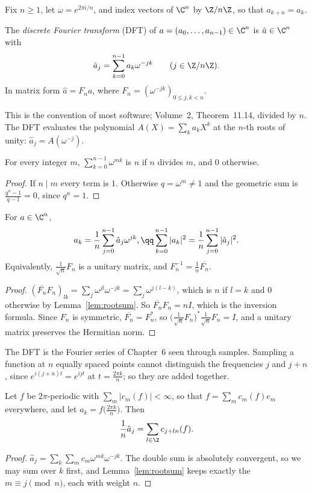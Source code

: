 Fix $n\ge1$, let $\omega=e^{2\pi i/n}$, and index vectors of $\C^n$ by $\Z/n\Z$, so that $a_{k+n}=a_k$.

\begin{definition}
The \emph{discrete Fourier transform} (DFT) of $a=(a_0,\dots,a_{n-1})\in\C^n$ is $\hat a\in\C^n$ with
\[
\hat a_j=\sum_{k=0}^{n-1}a_k\omega^{-jk}\qquad(j\in\Z/n\Z).
\]
In matrix form $\hat a=F_na$, where $F_n=(\omega^{-jk})_{0\le j,k<n}$.
\end{definition}

This is the convention of most software; Volume~2, Theorem~11.14, divided by $n$. The DFT evaluates the polynomial
$A(X)=\sum_ka_kX^k$ at the $n$-th roots of unity: $\hat a_j=A(\omega^{-j})$.

\begin{lemma}\label{lem:rootsum}
For every integer $m$, $\sum_{k=0}^{n-1}\omega^{mk}$ is $n$ if $n$ divides $m$, and $0$ otherwise.
\end{lemma}
\begin{proof}
If $n\mid m$ every term is $1$. Otherwise $q=\omega^m\ne1$ and the geometric sum is $\frac{q^n-1}{q-1}=0$, since $q^n=1$.
\end{proof}

\begin{theorem}\label{thm:dftinversion}
For $a\in\C^n$,
\[
\begin{gathered}a_k=\frac1n\sum_{j=0}^{n-1}\hat a_j\omega^{jk},\qq\sum_{k=0}^{n-1}|a_k|^2=\frac1n\sum_{j=0}^{n-1}|\hat a_j|^2.\end{gathered}
\]
Equivalently, $\frac1{\sqrt n}F_n$ is a unitary matrix, and $F_n^{-1}=\frac1n\overline{F_n}$.
\end{theorem}
\begin{proof}
$(\overline{F_n}F_n)_{lk}=\sum_j\omega^{jl}\omega^{-jk}=\sum_j\omega^{j(l-k)}$, which is $n$ if $l=k$ and $0$ otherwise by Lemma~\ref{lem:rootsum}. So $\overline{F_n}F_n=nI$,
which is the inversion formula. Since $F_n$ is symmetric, $\overline{F_n}=F_n^*$, so $\bigl(\frac1{\sqrt n}F_n\bigr)^*\frac1{\sqrt n}F_n=I$, and a unitary matrix preserves the
Hermitian norm.
\end{proof}

The DFT is the Fourier series of Chapter~6 seen through samples. Sampling a function at $n$ equally spaced points cannot
distinguish the frequencies $j$ and $j+n$, since $e^{i(j+n)t}=e^{ijt}$ at $t=\frac{2\pi k}n$; so they are added together.

\begin{proposition}[aliasing]\label{prop:aliasing}
Let $f$ be $2\pi$-periodic with $\sum_m|c_m(f)|<\infty$, so that $f=\sum_mc_m(f)e_m$ everywhere, and let $a_k=f\bigl(\frac{2\pi k}n\bigr)$. Then
\[
\frac1n\hat a_j=\sum_{l\in\Z}c_{j+ln}(f).
\]
\end{proposition}
\begin{proof}
$\hat a_j=\sum_k\sum_mc_m\omega^{mk}\omega^{-jk}$. The double sum is absolutely convergent, so we may sum over $k$ first, and
Lemma~\ref{lem:rootsum} keeps exactly the $m\equiv j\pmod n$, each with weight $n$.
\end{proof}

